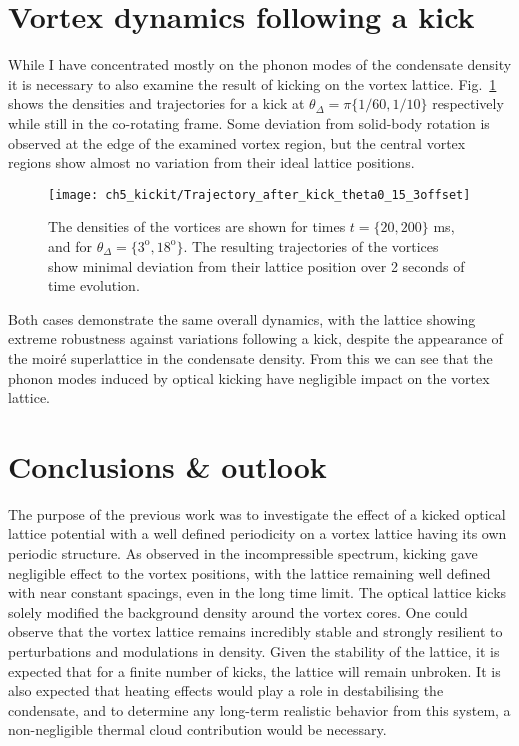 \section{Vortex dynamics following a kick}
While I have concentrated mostly on the phonon modes of the condensate density it is necessary to also examine the result of kicking on the vortex lattice. Fig.~\ref{fig:kickit_traj} shows the densities and trajectories for a kick at $\theta_{\Delta}=\pi\{1/60, 1/10\}$ respectively while still in the co-rotating frame. Some deviation from solid-body rotation is observed at the edge of the examined vortex region, but the central vortex regions show almost no variation from their ideal lattice positions.
\begin{figure}
    \centering
    \texttt{[image: ch5\_kickit/Trajectory\_after\_kick\_theta0\_15\_3offset]}
	\caption[Vortex densities and trajectories following a kick.]{The densities of the vortices are shown for times $t=\{20,200\}$ ms, and for $\theta_\Delta =\{ 3^{\textrm{o}},18^{\textrm{o}}\}$. The resulting trajectories of the vortices show minimal deviation from their lattice position over 2 seconds of time evolution.}\label{fig:kickit_traj}
\end{figure}

Both cases demonstrate the same overall dynamics, with the lattice showing extreme robustness against variations following a kick, despite the appearance of the moir\'e superlattice in the condensate density. From this we can see that the phonon modes induced by optical kicking have negligible impact on the vortex lattice.

\section{Conclusions \& outlook}\label{sec:ch5_conc}
The purpose of the previous work was to investigate the effect of a kicked optical lattice potential with a well defined periodicity on a vortex lattice having its own periodic structure. As observed in the incompressible spectrum, kicking gave negligible effect to the vortex positions, with the lattice remaining well defined with near constant spacings, even in the long time limit. The optical lattice kicks solely modified the background density around the vortex cores. One could observe that the vortex lattice remains incredibly stable and strongly resilient to perturbations and modulations in density. Given the stability of the lattice, it is expected that for a finite number of kicks, the lattice will remain unbroken. It is also expected that heating effects would play a role in destabilising the condensate, and to determine any long-term realistic behavior from this system, a non-negligible thermal cloud contribution would be necessary.

